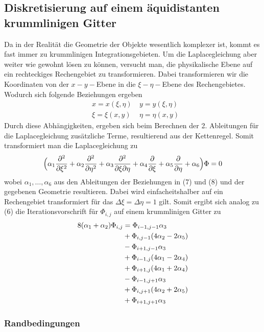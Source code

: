 \documentclass{article}
\begin{document}
\subsection{Diskretisierung auf einem äquidistanten krummlinigen Gitter}
Da in der Realität die Geometrie der Objekte wesentlich komplexer ist, kommt es fast immer zu krummlinigen Integrationsgebieten.
Um die Laplacegleichung aber weiter wie gewohnt lösen zu können, versucht man, die physikalische Ebene auf ein rechteckiges Rechengebiet
zu transformieren. Dabei transformieren wir die Koordinaten von der $x-y-$Ebene in die $\xi-\eta-$Ebene des Rechengebietes. Wodurch sich folgende
Beziehungen ergeben
\begin{align}
&x = x(\xi,\eta) \ &y = y(\xi,\eta)\\
&\xi=\xi(x,y) \  &\eta=\eta(x,y)  
\end{align}
Durch diese Abhängigkeiten, ergeben sich beim Berechnen der 2. Ableitungen für die Laplacegleichung zusätzliche Terme,
resultierend aus der Kettenregel.
Somit transformiert man die Laplacegleichung zu
\begin{align}
\Bigl( \alpha_1 \frac{\partial^2}{\partial \xi^2} 
+\alpha_2 \frac{\partial^2}{\partial \eta^2} 
+\alpha_3\frac{\partial^2}{\partial \xi \partial \eta}
+\alpha_4 \frac{\partial}{\partial \xi} 
+\alpha_5 \frac{\partial}{\partial \eta} +\alpha_6 \Bigr ) \Phi=0
\end{align}
wobei $\alpha_{1},\ldots,\alpha_{6}$ aus den Ableitungen der Beziehungen in (7) und (8) und der gegebenen Geometrie
resultieren.
Dabei wird einfacheitshalber auf ein Rechengebiet transformiert für das $\Delta \xi=\Delta \eta=1$ gilt.
Somit ergibt sich analog zu (6) die Iterationsvorschrift für $\Phi_{i,j}$ auf einem krummlinigen Gitter zu
\begin{align}
8(\alpha_1+\alpha_2)\Phi_{i,j}  
&= \Phi_{i-1,j-1} \alpha_3 \\
&+\Phi_{i,j-1}(4\alpha_2-2\alpha_5) \notag \\
&-\Phi_{i+1,j-1} \alpha_3 \notag \\
&+\Phi_{i-1,j} (4\alpha_1-2\alpha_4)\notag  \\
&+\Phi_{i+1,j} (4\alpha_1+2\alpha_4)\notag  \\
&-\Phi_{i-1,j+1} \alpha_3\notag  \\
&+\Phi_{i,j+1} (4\alpha_2+2\alpha_5)\notag \\
&+\Phi_{i+1,j+1}\alpha_3 \notag 
\end{align}
\subsubsection{Randbedingungen}
\end{document}
